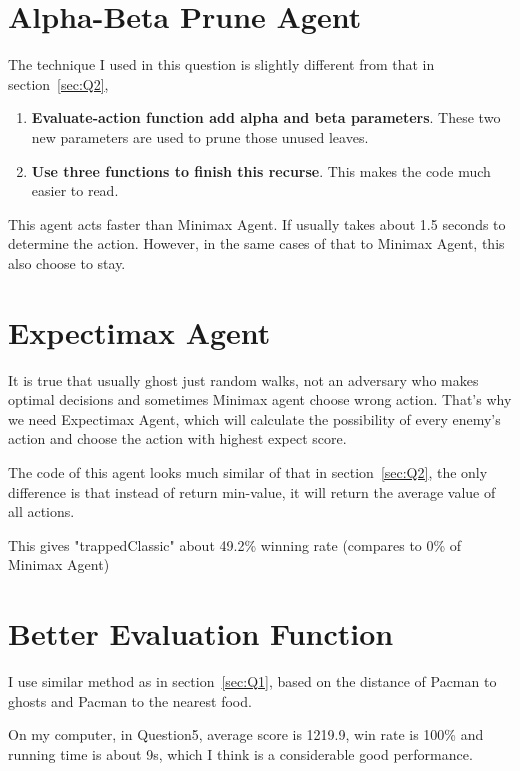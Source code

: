 \documentclass{article}
\begin{document}
	\section{Alpha-Beta Prune Agent}
	\label{sec:Q3}
	The technique I used in this question is slightly different from that in section~\ref{sec:Q2},
	\begin{enumerate}
		\item \textbf{Evaluate-action function add alpha and beta parameters}. These two new parameters are used to prune those unused leaves.
		\item \textbf{Use three functions to finish this recurse}. This makes the code much easier to read.
	\end{enumerate}
	This agent acts faster than Minimax Agent. If usually takes about 1.5 seconds to determine the action. However, in the same cases of that to Minimax Agent, this also choose to stay.
	\section{Expectimax Agent}
	\label{sec:Q4}
	It is true that usually ghost just random walks, not an adversary who makes optimal decisions and sometimes Minimax agent choose wrong action. That's why we need Expectimax Agent, which will calculate the possibility of every enemy's action and choose the action with highest expect score.\par
	The code of this agent looks much similar of that in section~\ref{sec:Q2}, the only difference is that instead of return min-value, it will return the average value of all actions.\par
	This gives "trappedClassic" about 49.2\% winning rate (compares to 0\% of Minimax Agent)
	\section{Better Evaluation Function}
	\label{sec:Q5}
	I use similar method as in section~\ref{sec:Q1}, based on the distance of Pacman to ghosts and Pacman to the nearest food.\par
	On my computer, in Question5, average score is 1219.9, win rate is 100\% and running time is about 9s, which I think is a considerable good performance.
\end{document}
